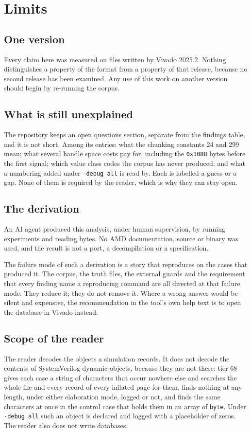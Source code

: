 \section{Limits}
\label{sec:limitations}

\subsection{One version}

Every claim here was measured on files written by Vivado 2025.2.
Nothing distinguishes a property of the format from a property of that
release, because no second release has been examined. Any use of this
work on another version should begin by re-running the corpus.

\subsection{What is still unexplained}

The repository keeps an open questions section, separate from the
findings table, and it is not short. Among its entries: what the
chunking constants 24 and 299 mean; what several handle space costs
pay for, including the \texttt{0x1088} bytes before the first signal;
which value class codes the corpus has never produced; and what a
numbering added under \texttt{-debug all} is read by. Each is labelled
a guess or a gap. None of them is required by the reader, which is why
they can stay open.

\subsection{The derivation}

An AI agent produced this analysis, under human supervision, by
running experiments and reading bytes. No AMD documentation, source or
binary was used, and the result is not a port, a decompilation or a
specification.

The failure mode of such a derivation is a story that reproduces on
the cases that produced it. The corpus, the truth files, the external
guards and the requirement that every finding name a reproducing
command are all directed at that failure mode. They reduce it; they do
not remove it. Where a wrong answer would be silent and expensive,
the recommendation in the tool's own help text is to open the database
in Vivado instead.

\subsection{Scope of the reader}

The reader decodes the objects a simulation records. It does not
decode the contents of SystemVerilog dynamic objects, because they are
not there: tier 68 gives each case a string of characters that occur
nowhere else and searches the whole file and every record of every
inflated page for them, finds nothing at any length, under either
elaboration mode, logged or not, and finds the same characters at once
in the control case that holds them in an array of \texttt{byte}.
Under \texttt{-debug all} such an object is declared and logged with a
placeholder of zeros. The reader also does not write databases.
